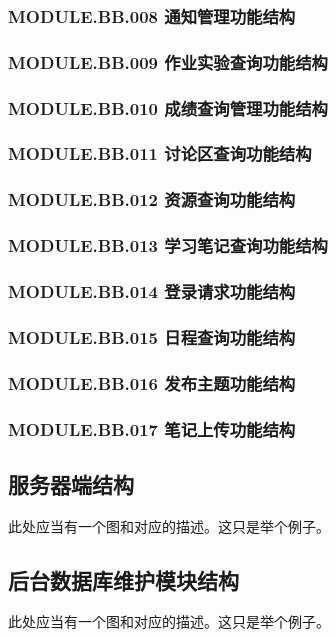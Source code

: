 \subsubsection{MODULE.BB.008    通知管理功能结构}
\subsubsection{MODULE.BB.009    作业实验查询功能结构}
\subsubsection{MODULE.BB.010    成绩查询管理功能结构}
\subsubsection{MODULE.BB.011    讨论区查询功能结构}
\subsubsection{MODULE.BB.012    资源查询功能结构}
\subsubsection{MODULE.BB.013    学习笔记查询功能结构}
\subsubsection{MODULE.BB.014    登录请求功能结构}
\subsubsection{MODULE.BB.015    日程查询功能结构}
\subsubsection{MODULE.BB.016    发布主题功能结构}
\subsubsection{MODULE.BB.017    笔记上传功能结构}


\subsection{服务器端结构}
此处应当有一个图和对应的描述。这只是举个例子。

\subsection{后台数据库维护模块结构}
此处应当有一个图和对应的描述。这只是举个例子。



